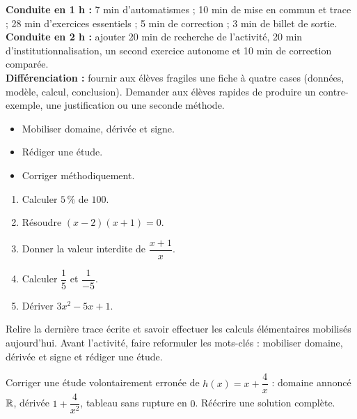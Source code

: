 \ifprof
\begin{methode}
\textbf{Conduite en 1 h :} 7 min d'automatismes ; 10 min de mise en commun et trace ; 28 min d'exercices essentiels ; 5 min de correction ; 3 min de billet de sortie.\\
\textbf{Conduite en 2 h :} ajouter 20 min de recherche de l'activité, 20 min d'institutionnalisation, un second exercice autonome et 10 min de correction comparée.\\
\textbf{Différenciation :} fournir aux élèves fragiles une fiche à quatre cases (données, modèle, calcul, conclusion). Demander aux élèves rapides de produire un contre-exemple, une justification ou une seconde méthode.
\end{methode}
\fi
{}
\begin{objectifs}\begin{itemize}\item Mobiliser domaine, dérivée et signe.\item Rédiger une étude.\item Corriger méthodiquement.\end{itemize}\end{objectifs}
\begin{automatismes}\begin{enumerate}\item Calculer $5\,\%$ de $100$. \item Résoudre $(x-2)(x+1)=0$. \item Donner la valeur interdite de $\dfrac{x+1}{x}$. \item Calculer $\dfrac1{5}$ et $\dfrac1{-5}$. \item Dériver $3x^2-5x+1$. \end{enumerate}\end{automatismes}
\begin{prerequis}Relire la dernière trace écrite et savoir effectuer les calculs élémentaires mobilisés aujourd'hui. Avant l'activité, faire reformuler les mots-clés : mobiliser domaine, dérivée et signe et rédiger une étude.\end{prerequis}

\begin{activite}
Corriger une étude volontairement erronée de $h(x)=x+\dfrac4x$ : domaine annoncé $\mathbb{R}$, dérivée $1+\dfrac4{x^2}$, tableau sans rupture en $0$. Réécrire une solution complète.

\end{activite}

